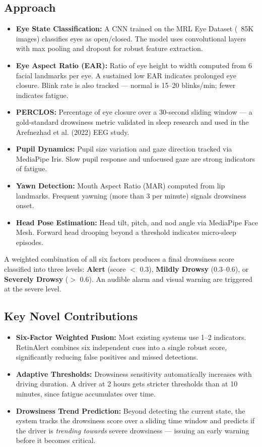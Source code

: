 \documentclass[9pt]{article}
\begin{document}
\subsection*{Approach}
\begin{itemize}[nosep, leftmargin=*, topsep=0pt]
    \item \textbf{Eye State Classification:} A CNN trained on the MRL Eye Dataset (~85K images) classifies eyes as open/closed. The model uses convolutional layers with max pooling and dropout for robust feature extraction.
    \item \textbf{Eye Aspect Ratio (EAR):} Ratio of eye height to width computed from 6 facial landmarks per eye. A sustained low EAR indicates prolonged eye closure. Blink rate is also tracked --- normal is 15--20 blinks/min; fewer indicates fatigue.
    \item \textbf{PERCLOS:} Percentage of eye closure over a 30-second sliding window --- a gold-standard drowsiness metric validated in sleep research and used in the Arefnezhad et al. (2022) EEG study.
    \item \textbf{Pupil Dynamics:} Pupil size variation and gaze direction tracked via MediaPipe Iris. Slow pupil response and unfocused gaze are strong indicators of fatigue.
    \item \textbf{Yawn Detection:} Mouth Aspect Ratio (MAR) computed from lip landmarks. Frequent yawning (more than 3 per minute) signals drowsiness onset.
    \item \textbf{Head Pose Estimation:} Head tilt, pitch, and nod angle via MediaPipe Face Mesh. Forward head drooping beyond a threshold indicates micro-sleep episodes.
\end{itemize}
\vspace{1pt}
A weighted combination of all six factors produces a final drowsiness score classified into three levels: \textbf{Alert} (score $<$ 0.3), \textbf{Mildly Drowsy} (0.3--0.6), or \textbf{Severely Drowsy} ($>$ 0.6). An audible alarm and visual warning are triggered at the severe level.

\subsection*{Key Novel Contributions}
\begin{itemize}[nosep, leftmargin=*, topsep=0pt]
    \item \textbf{Six-Factor Weighted Fusion:} Most existing systems use 1--2 indicators. RetinAlert combines six independent cues into a single robust score, significantly reducing false positives and missed detections.
    \item \textbf{Adaptive Thresholds:} Drowsiness sensitivity automatically increases with driving duration. A driver at 2 hours gets stricter thresholds than at 10 minutes, since fatigue accumulates over time.
    \item \textbf{Drowsiness Trend Prediction:} Beyond detecting the current state, the system tracks the drowsiness score over a sliding time window and predicts if the driver is \textit{trending towards} severe drowsiness --- issuing an early warning before it becomes critical.
\end{itemize}
\end{document}
